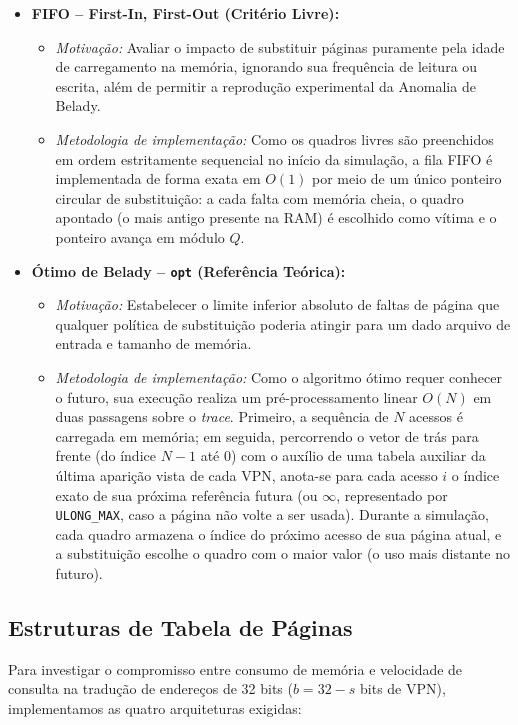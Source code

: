 \documentclass[12pt,a4paper]{article}
\begin{document}
\begin{itemize}
    \item \textbf{FIFO -- First-In, First-Out (Critério Livre):}
    \begin{itemize}
        \item \textit{Motivação:} Avaliar o impacto de substituir páginas puramente pela idade de carregamento na memória, ignorando sua frequência de leitura ou escrita, além de permitir a reprodução experimental da Anomalia de Belady.
        \item \textit{Metodologia de implementação:} Como os quadros livres são preenchidos em ordem estritamente sequencial no início da simulação, a fila FIFO é implementada de forma exata em $O(1)$ por meio de um único ponteiro circular de substituição: a cada falta com memória cheia, o quadro apontado (o mais antigo presente na RAM) é escolhido como vítima e o ponteiro avança em módulo $Q$.
    \end{itemize}

    \item \textbf{Ótimo de Belady -- \texttt{opt} (Referência Teórica):}
    \begin{itemize}
        \item \textit{Motivação:} Estabelecer o limite inferior absoluto de faltas de página que qualquer política de substituição poderia atingir para um dado arquivo de entrada e tamanho de memória.
        \item \textit{Metodologia de implementação:} Como o algoritmo ótimo requer conhecer o futuro, sua execução realiza um pré-processamento linear $O(N)$ em duas passagens sobre o \textit{trace}. Primeiro, a sequência de $N$ acessos é carregada em memória; em seguida, percorrendo o vetor de trás para frente (do índice $N-1$ até $0$) com o auxílio de uma tabela auxiliar da última aparição vista de cada VPN, anota-se para cada acesso $i$ o índice exato de sua próxima referência futura (ou $\infty$, representado por \texttt{ULONG\_MAX}, caso a página não volte a ser usada). Durante a simulação, cada quadro armazena o índice do próximo acesso de sua página atual, e a substituição escolhe o quadro com o maior valor (o uso mais distante no futuro).
    \end{itemize}
\end{itemize}

\subsection{Estruturas de Tabela de Páginas}

Para investigar o compromisso entre consumo de memória e velocidade de consulta na tradução de endereços de 32 bits ($b = 32 - s$ bits de VPN), implementamos as quatro arquiteturas exigidas:
\end{document}
